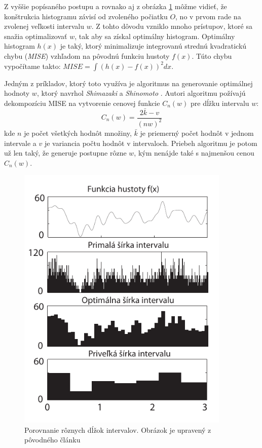 Z vyššie popísaného postupu a rovnako aj z obrázka \ref{fig:binsizehistogram} môžme vidieť, že konštrukcia histogramu závisí od zvoleného počiatku $ O $, no v prvom rade na zvolenej veľkosti intervalu $ w $. Z tohto dôvodu vzniklo mnoho prístupov, ktoré sa snažia optimalizovať $ w $, tak aby sa získal optimálny histogram. Optimálny histogram $ h(x) $ je taký, ktorý minimalizuje integrovanú strednú kvadratickú chybu (\textit{MISE}) vzhľadom na pôvodnú funkciu hustoty $ f(x) $. Túto chybu vypočítame takto: $ MISE = \int (h(x) - f(x))^2 dx $. 

Jedným z príkladov, ktorý toto využíva je algoritmus na generovanie optimálnej hodnoty $ w $, ktorý navrhol \textit{Shimazaki} a \textit{Shinomoto} \cite{OptBinSize}. Autori algoritmu požívajú dekompozíciu MISE na vytvorenie cenovej funkcie $ C_{n}(w) $ pre dĺžku intervalu $ w $:
\[
	C_{n}(w) = \frac{2\bar{k} - v}{(nw)^2}
\]
kde $ n $ je počet všetkých hodnôt množiny, $ \bar{k}$ je priemerný počet hodnôt v jednom intervale a $ v $ je variancia počtu hodnôt v intervaloch. Priebeh algoritmu je potom už len taký, že generuje postupne rôzne $ w $, kým nenájde také s najmenšou cenou $ C_{n}(w) $. 

\begin{figure}
	\centering
	\includegraphics[width = 4in]{binsizehistogram}
	\caption{ Porovnanie rôznych dĺžok intervalov. Obrázok je upravený z pôvodného článku \cite{OptBinSize} }
	\label{fig:binsizehistogram}
\end{figure}


